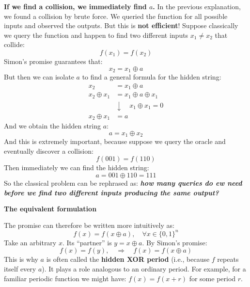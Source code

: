 \highspace
\textcolor{Green3}{ \textbf{If we find a collision, we immediately find $a$.}} In the previous explanation, we found a collision by brute force. We queried the function for all possible inputs and observed the outputs. But this is \textbf{not efficient}! Suppose classically we query the function and happen to find two different inputs $x_1 \neq x_2$ that collide:
\begin{equation*}
    f(x_1) = f(x_2)
\end{equation*}
Simon's promise guarantees that:
\begin{equation*}
    x_2 = x_1 \oplus a
\end{equation*}
But then we can isolate $a$ to find a general formula for the hidden string:
\begin{align*}
    x_2 &= x_1 \oplus a \\
    x_2 \oplus x_1 &= x_1 \oplus a \oplus x_1 \\
    &\downarrow \quad x_1 \oplus x_1 = 0 \\
    x_2 \oplus x_1 &= a
\end{align*}
And we obtain the hidden string $a$:
\begin{equation}
    a = x_1 \oplus x_2
\end{equation}
And this is extremely important, because suppose we query the oracle and eventually discover a collision:
\begin{equation*}
    f(001) = f(110)
\end{equation*}
Then immediately we can find the hidden string:
\begin{equation*}
    a = 001 \oplus 110 = 111
\end{equation*}
So the classical problem can be rephrased as: \emph{\textbf{how many queries do ew need before we find two different inputs producing the same output?}}

\newpage

\begin{flushleft}
    \textcolor{Green3}{ \textbf{The equivalent formulation}}
\end{flushleft}
The promise can therefore be written more intuitively as:
\begin{equation}
    f(x) = f\left(x \oplus a\right), \quad \forall x \in \{0,1\}^{n}
\end{equation}
Take an arbitrary $x$. Its ``partner'' is $y = x \oplus a$. By Simon's promise:
\begin{equation*}
    f(x) = f(y), \quad \Rightarrow \quad f(x) = f\left(x \oplus a\right)
\end{equation*}
This is why $a$ is often called the \textbf{hidden XOR period} (i.e., because $f$ repeats itself every $a$). It plays a role analogous to an ordinary period. For example, for a familiar periodic function we might have: $f(x) = f(x + r)$ for some period $r$.

